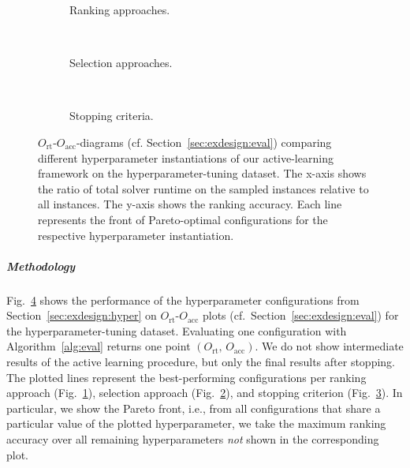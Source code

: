 \documentclass[sn-basic, Numbered]{sn-jnl} %
\begin{document}
\begin{figure}[tbp!]
  \centering
  \begin{subfigure}{1.0\textwidth}
    \caption{Ranking approaches.}
    \label{fig:annitraincolorranking}
  \end{subfigure}
  \\
  \vspace{0.2cm}
  \begin{subfigure}{1.0\textwidth}
    \caption{Selection approaches.}
    \label{fig:annitraincolorselection}
  \end{subfigure}
  \\
  \vspace{0.2cm}
  \begin{subfigure}{1.0\textwidth}
    \caption{Stopping criteria.}
    \label{fig:annitraincolorstopping}
  \end{subfigure}
  \caption{
    $O_{\operatorname{rt}}$-$O_{\operatorname{acc}}$-diagrams (cf. Section~\ref{sec:exdesign:eval}) comparing different hyperparameter instantiations of our active-learning framework on the hyperparameter-tuning dataset.
    The x-axis shows the ratio of total solver runtime on the sampled instances relative to all instances.
    The y-axis shows the ranking accuracy.
    Each line represents the front of Pareto-optimal configurations for the respective hyperparameter instantiation.
  }
  \label{fig:e2eallsolvers}
\end{figure}

\subparagraph{Methodology}

Fig.~\ref{fig:e2eallsolvers} shows the performance of the hyperparameter configurations from Section~\ref{sec:exdesign:hyper} on $O_{\operatorname{rt}}$-$O_{\operatorname{acc}}$ plots (cf.~Section~\ref{sec:exdesign:eval}) for the hyperparameter-tuning dataset.
Evaluating one configuration with Algorithm~\ref{alg:eval} returns one point $\left(O_{\operatorname{rt}},\, O_{\operatorname{acc}}\right)$.
We do not show intermediate results of the active learning procedure, but only the final results after stopping.
The plotted lines represent the best-performing configurations per ranking approach (Fig.~\ref{fig:annitraincolorranking}), selection approach (Fig.~\ref{fig:annitraincolorselection}), and stopping criterion (Fig.~\ref{fig:annitraincolorstopping}).
In particular, we show the Pareto front, i.e., from all configurations that share a particular value of the plotted hyperparameter, we take the maximum ranking accuracy over all remaining hyperparameters \emph{not} shown in the corresponding plot.
\end{document}
